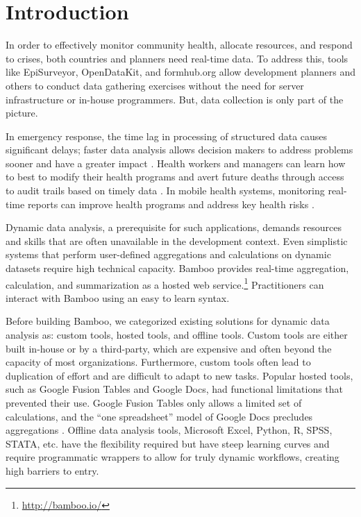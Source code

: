 \documentclass{acm_proc_article-sp}
\begin{document}



\section{Introduction}
In order to effectively monitor community health, allocate resources, and respond to crises, both countries and planners need real-time data. 
To address this, tools like EpiSurveyor, OpenDataKit, and formhub.org allow development planners and others to conduct data gathering exercises without the need for server infrastructure or in-house programmers.  
But, data collection is only part of the picture.

In emergency response, the time lag in processing of structured data causes significant delays; faster data analysis allows decision makers to address problems sooner and have a greater impact \cite{internews}.
Health workers and managers can learn how to best to modify their health programs
and avert future deaths
through access to audit trails based on timely data \cite{krisberg}.
In mobile health systems, monitoring real-time reports can improve health programs and address key health risks \cite{mechael}.  

Dynamic data analysis, a prerequisite for such applications, demands resources and skills that are often unavailable in the development context.  Even simplistic systems that perform user-defined aggregations and calculations on dynamic datasets require high technical capacity.  Bamboo provides real-time aggregation, calculation, and summarization as a hosted web service.\footnote{\url{http://bamboo.io/}}  Practitioners can interact with Bamboo using an easy to learn syntax.

Before building Bamboo, we categorized existing solutions for dynamic data analysis as: custom tools, hosted tools, and offline tools.  Custom tools are either built in-house or by a third-party, which are expensive and often beyond the capacity of most organizations. Furthermore, custom tools often lead to duplication of effort and are difficult to adapt to new tasks.  Popular hosted tools, such as Google Fusion Tables and Google Docs, had functional limitations that prevented their use.  Google Fusion Tables only allows a limited set of calculations, and the ``one spreadsheet'' model of Google Docs precludes aggregations \cite{gonzalez1, gonzalez2}.  Offline data analysis tools, Microsoft Excel, Python, R, SPSS, STATA, etc. have the flexibility required but have steep learning curves and require programmatic wrappers to allow for truly dynamic workflows, creating high barriers to entry.
\end{document}
